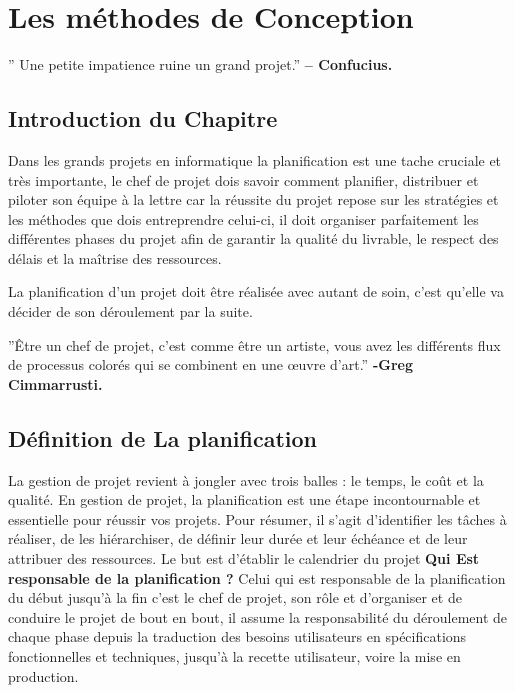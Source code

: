 \documentclass{report}
\begin{document}
\vspace*{\fill}
\newpage






\chapter{ Les méthodes de Conception } 

\huge
'' Une petite impatience ruine un grand projet.'' \textbf{– Confucius.} \newline

\Large
\section{Introduction du Chapitre }


Dans les grands projets en informatique la planification est une tache cruciale et très importante, le chef de projet dois savoir comment planifier, distribuer et piloter son équipe à la lettre car la réussite du projet repose sur les stratégies et les méthodes que dois entreprendre celui-ci, il doit organiser parfaitement les différentes phases du projet afin de garantir la qualité du livrable, le respect des délais et la maîtrise des ressources.

La planification d’un projet doit être réalisée avec autant de soin, c’est qu’elle va décider de son déroulement par la suite.

\newpage
\huge
''Être un chef de projet, c’est comme être un artiste, vous avez les différents flux de processus colorés qui se combinent en une œuvre d’art.''
\textbf{-Greg Cimmarrusti.}

\Large
\section{Définition de La planification}
La gestion de projet revient à jongler avec trois balles : le temps, le coût et la qualité.
\newline
En gestion de projet, la planification est une étape incontournable et essentielle pour réussir vos projets. Pour résumer, il s'agit d'identifier les tâches à réaliser, de les hiérarchiser, de définir leur durée et leur échéance et de leur attribuer des ressources. Le but est d'établir le calendrier du projet
\newline
\newline
\textbf{Qui Est responsable de la planification ?}
Celui qui est responsable de la planification du début jusqu’à la fin c’est le chef de projet, son rôle et d’organiser et de conduire le projet de bout en bout, il assume la responsabilité du déroulement de chaque phase depuis la traduction des besoins utilisateurs en spécifications fonctionnelles et techniques, jusqu'à la recette utilisateur, voire la mise en production.
\end{document}
